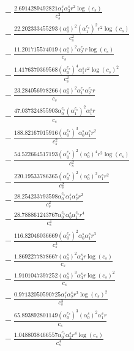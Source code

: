 \documentclass[10pt]{article}
\begin{document}
\begin{align*}
&{}  - \frac{2.6914289492821 \alpha_{1}^s \alpha_{3}^s r^{2} \log{\left(c_{s} \right)}}{c_{s}^{2}} \\
&{}  - \frac{22.202333455293 \left(\alpha_{0}^s\right)^{2} \left(\alpha_{1}^{c_s}\right)^{2} r^{2} \log{\left(c_{s} \right)}}{c_{s}^{2}} \\
&{}  - \frac{11.201715574019 \left(\alpha_{1}^s\right)^{2} \alpha_{2}^{c_s} r \log{\left(c_{s} \right)}}{c_{s}} \\
&{}  - \frac{1.4176370369568 \left(\alpha_{0}^{c_s}\right)^{4} \alpha_{1}^s r^{2} \log{\left(c_{s} \right)}^{2}}{c_{s}^{2}} \\
&{}  - \frac{23.284056978266 \left(\alpha_{0}^s\right)^{2} \alpha_{1}^{c_s} \alpha_{2}^{c_s} r}{c_{s}} \\
&{}  - \frac{47.037324855903 \alpha_{0}^{c_s} \left(\alpha_{1}^{c_s}\right)^{2} \alpha_{1}^s r}{c_{s}} \\
&{}  - \frac{188.82167015916 \left(\alpha_{0}^{c_s}\right)^{3} \alpha_{0}^s \alpha_{1}^s r^{2}}{c_{s}^{2}} \\
&{}  - \frac{54.522664517193 \left(\alpha_{0}^{c_s}\right)^{2} \left(\alpha_{0}^s\right)^{4} r^{2} \log{\left(c_{s} \right)}}{c_{s}^{2}} \\
&{}  - \frac{220.19533786365 \left(\alpha_{0}^{c_s}\right)^{2} \left(\alpha_{0}^s\right)^{2} \alpha_{1}^s r^{2}}{c_{s}^{2}} \\
&{}  - \frac{28.254233793598 \alpha_{0}^{c_s} \alpha_{1}^s \alpha_{2}^s r^{2}}{c_{s}^{2}} \\
&{}  - \frac{28.788861243767 \alpha_{0}^{c_s} \alpha_{0}^s \alpha_{1}^{c_s} r^{4}}{c_{s}^{4}} \\
&{}  - \frac{116.82046036669 \left(\alpha_{0}^{c_s}\right)^{2} \alpha_{0}^s \alpha_{1}^s r^{3}}{c_{s}^{3}} \\
&{}  - \frac{1.8692277878667 \left(\alpha_{0}^s\right)^{2} \alpha_{4}^s r \log{\left(c_{s} \right)}}{c_{s}} \\
&{}  - \frac{1.9101047397252 \left(\alpha_{0}^s\right)^{3} \alpha_{3}^s r \log{\left(c_{s} \right)}^{2}}{c_{s}} \\
&{}  - \frac{0.97132050590725 \alpha_{1}^s \alpha_{2}^s r^{3} \log{\left(c_{s} \right)}^{2}}{c_{s}^{3}} \\
&{}  - \frac{65.893892801149 \left(\alpha_{0}^{c_s}\right)^{3} \left(\alpha_{0}^s\right)^{2} \alpha_{1}^s r}{c_{s}} \\
&{}  - \frac{1.0488038466557 \alpha_{0}^{c_s} \alpha_{2}^s r^{4} \log{\left(c_{s} \right)}}{c_{s}^{4}} \\

\end{align*}
\end{document}
